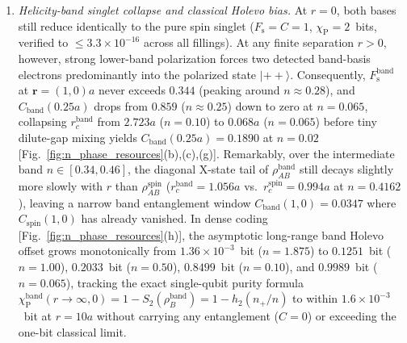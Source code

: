 \documentclass[aps,prb,twocolumn,superscriptaddress,longbibliography]{revtex4-2}
\begin{document}
\begin{enumerate}
\item \emph{Helicity-band singlet collapse and classical Holevo bias.}
At $r=0$, both bases still reduce identically to the pure spin singlet
($F_{\mathrm{s}}=C=1$, $\chi_{\mathrm{P}}=2$~bits, verified to
$\le 3.3\times 10^{-16}$ across all fillings). At any finite separation
$r>0$, however, strong lower-band polarization forces two detected
band-basis electrons predominantly into the polarized state $|{++}\rangle$.
Consequently, $F_{\mathrm{s}}^{\mathrm{band}}$ at $\mathbf{r}=(1,0)a$
never exceeds $0.344$ (peaking around $n\approx 0.28$), and
$C_{\mathrm{band}}(0.25a)$ drops from $0.859$ ($n\approx 0.25$) down to
zero at $n=0.065$, collapsing $r_c^{\mathrm{band}}$ from $2.723a$
($n=0.10$) to $0.068a$ ($n=0.065$) before tiny dilute-gap mixing yields
$C_{\mathrm{band}}(0.25a)=0.1890$ at $n=0.02$
[Fig.~\ref{fig:n_phase_resources}(b),(c),(g)]. Remarkably, over the
intermediate band $n\in[0.34,0.46]$, the diagonal X-state tail of
$\rho_{AB}^{\mathrm{band}}$ still decays slightly more slowly with $r$
than $\rho_{AB}^{\mathrm{spin}}$ ($r_c^{\mathrm{band}}=1.056a$ vs.\
$r_c^{\mathrm{spin}}=0.994a$ at $n=0.4162$), leaving a narrow band
entanglement window $C_{\mathrm{band}}(1,0)=0.0347$ where
$C_{\mathrm{spin}}(1,0)$ has already vanished. In dense coding
[Fig.~\ref{fig:n_phase_resources}(h)], the asymptotic long-range band
Holevo offset grows monotonically from $1.36\times 10^{-3}$~bit
($n=1.875$) to $0.1251$~bit ($n=1.00$), $0.2033$~bit ($n=0.50$),
$0.8499$~bit ($n=0.10$), and $0.9989$~bit ($n=0.065$), tracking the
exact single-qubit purity formula $\chi_{\mathrm{P}}^{\mathrm{band}}(r\to\infty,0)=1-S_2(\rho_B^{\mathrm{band}})=1-h_2(n_+/n)$
to within $1.6\times 10^{-3}$~bit at $r=10a$ without carrying any
entanglement ($C=0$) or exceeding the one-bit classical limit.


\end{enumerate}
\end{document}

